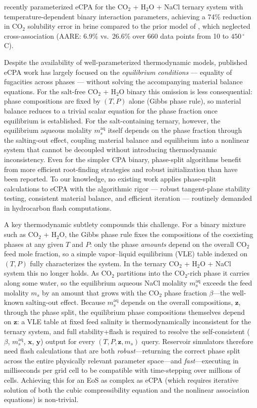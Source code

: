 \documentclass[preprint,12pt,number]{elsarticle}
\begin{document}
\citet{Coelho2025} recently parameterized eCPA for the CO$_2$ + H$_2$O + NaCl ternary system
with temperature-dependent binary interaction parameters, achieving a 74\% reduction in CO$_2$ solubility error in brine
compared to the prior model of \citet{MaribMogensen2015}, which neglected cross-association (AARE: 6.9\% vs.\ 26.6\% over
660 data points from 10 to $450\,^\circ$C).

Despite the availability of well-parameterized thermodynamic models, published eCPA work
has largely focused on the \emph{equilibrium conditions} --- equality of fugacities across phases ---
without solving the accompanying material balance equations.
For the salt-free CO$_2$ + H$_2$O binary this omission is less consequential:
phase compositions are fixed by $(T, P)$ alone (Gibbs phase rule), so material balance
reduces to a trivial scalar equation for the phase fraction once equilibrium is established.
For the salt-containing ternary, however, the equilibrium aqueous molality $m_s^\mathrm{aq}$
itself depends on the phase fraction through the salting-out effect, coupling material balance
and equilibrium into a nonlinear system that cannot be decoupled without introducing
thermodynamic inconsistency.
Even for the simpler CPA binary, phase-split algorithms benefit from more efficient
root-finding strategies and robust initialization than have been reported.
To our knowledge, no existing work applies phase-split calculations to eCPA with the
algorithmic rigor --- robust tangent-plane stability testing, consistent material balance,
and efficient iteration --- routinely demanded in hydrocarbon flash computations.

A key thermodynamic subtlety compounds this challenge.
For a binary mixture such as CO$_2$ + H$_2$O, the Gibbs phase rule fixes the compositions of
the coexisting phases at any given $T$ and $P$: only the phase \emph{amounts} depend on the
overall CO$_2$ feed mole fraction, so a simple vapor--liquid equilibrium (VLE) table indexed on
$(T, P)$ fully characterizes the system.
In the ternary CO$_2$ + H$_2$O + NaCl system this no longer holds.
As CO$_2$ partitions into the CO$_2$-rich phase it carries along some water, so the
equilibrium aqueous NaCl molality $m_s^\mathrm{aq}$ exceeds the feed molality $m_s$
by an amount that grows with the CO$_2$ phase fraction $\beta$---the well-known
salting-out effect.
Because $m_s^\mathrm{aq}$ depends on the overall compositions, $\mathbf{z}$, through the phase split, the equilibrium
phase compositions themselves depend on $\mathbf{z}$: a VLE table at fixed feed salinity is
thermodynamically inconsistent for the ternary system, and full stability+flash is
required to resolve the self-consistent ($\beta$, $m_s^\mathrm{aq}$, $\mathbf{x}$, $\mathbf{y}$) output for
every $(T, P, \mathbf{z}, m_s)$ query.
Reservoir simulators therefore need flash calculations that are both \emph{robust}---returning the correct
phase split across the entire physically relevant parameter space---and \emph{fast}---executing
in milliseconds per grid cell to be compatible with time-stepping over millions of cells.
Achieving this for an EoS as complex as eCPA (which requires iterative solution of both the
cubic compressibility equation and the nonlinear association equations) is non-trivial.
\end{document}
